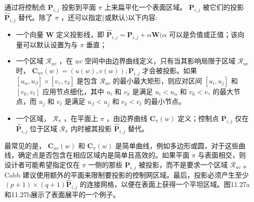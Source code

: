 \documentclass[../main.tex]{subfiles}
\begin{document}
通过将控制点 \({\mathbf{P}}_{i,j}\) 投影到平面 \(\pi\) 上来扁平化一个表面区域。 \({\mathbf{P}}_{i,j}\) 被它们的投影 \({\widehat{\mathbf{P}}}_{i,j}\) 替代。除了 \(\pi\) ，还可以指定(或默认)以下内容:

\begin{itemize}
\item 一个向量 \(\mathbf{W}\) 定义投影线，即 \({\widehat{\mathbf{P}}}_{i,j} = {\mathbf{P}}_{i,j} + \alpha \mathbf{W}(\alpha\) 可以是负值或正值；该向量可以默认设置为与 \(\pi\) 垂直；
\end{itemize}

\begin{itemize}
\item 一个区域 \({\mathcal{R}}_{uv}\) ，在 \({uv}\) 空间中由边界曲线定义，只有当其影响局限于区域 \({\mathcal{R}}_{uv}\) 时， \({\mathbf{C}}_{uv}\left( w\right)  = \left( {u\left( w\right) ,v\left( w\right) }\right) ;{\mathbf{P}}_{i,j}\) 才会被投影。如果 \(\left\lbrack  {{u}_{\alpha },{u}_{\beta }}\right\rbrack   \times  \left\lbrack  {{v}_{\gamma },{v}_{\delta }}\right\rbrack\) 是包含 \({\mathcal{R}}_{uv}\) 的最小最大矩形，则应对区间 \(\left\lbrack  {{u}_{i},{u}_{j}}\right\rbrack\) 和 \(\left\lbrack  {{v}_{k},{v}_{\ell }}\right\rbrack\) 应用节点细化，其中 \({u}_{i}\) 和 \({v}_{k}\) 是满足 \({u}_{i} < {u}_{\alpha }\) 和 \({v}_{k} < {v}_{\gamma }\) 的最大节点，而 \({u}_{j}\) 和 \({v}_{\ell }\) 是满足 \({u}_{\beta } < {u}_{j}\) 和 \({v}_{\delta } < {v}_{\ell }\) 的最小节点。
\end{itemize}

\begin{itemize}
\item 一个区域， \({\mathcal{R}}_{\pi }\) ，在平面上 \(\pi\) ，由边界曲线 \({\mathbf{C}}_{\pi }\left( w\right)\) 定义；控制点 \({\mathbf{P}}_{i,j}\) 仅在 \({\widehat{\mathbf{P}}}_{i,j}\) 位于区域 \({\mathcal{R}}_{\pi }\) 内时被其投影 \({\widehat{\mathbf{P}}}_{i,j}\) 替代。
\end{itemize}

最常见的是， \({\mathbf{C}}_{uv}\left( w\right)\) 和 \({\mathbf{C}}_{\pi }\left( w\right)\) 是简单曲线，例如多边形或圆，对于这些曲线，确定点是否包含在相应区域内是简单且高效的。如果平面 \(\pi\) 与表面相交，则设计者可能希望指定仅在 \(\pi\) 一侧的那些 \({\mathbf{P}}_{i,j}\) 被投影，而不是要求一个区域 \({\mathcal{R}}_{uv}\) 。Cobb \cite{Cobb84}建议使用额外的平面来限制要投影的控制网区域。最后，投影必须产生至少 \(\left( {p + 1}\right)  \times  \left( {q + 1}\right) {\widehat{\mathbf{P}}}_{i,j}\) 的连接网格，以便在表面上获得一个平坦区域。图11.27a和11.27b展示了表面展平的一个例子。
\end{document}
